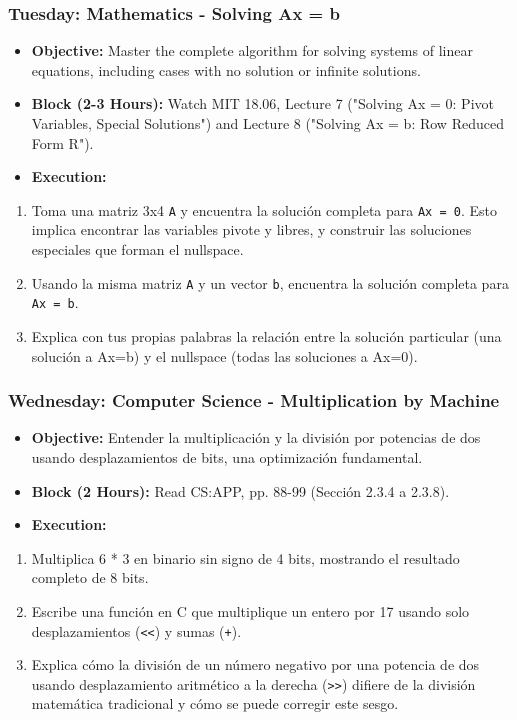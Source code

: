 \subsubsection{\textbf{Tuesday: Mathematics - Solving Ax = b}}
\begin{itemize}
  \item \textbf{Objective:} Master the complete algorithm for solving systems of linear equations, including cases with no solution or infinite solutions.
  \item \textbf{Block (2-3 Hours):} Watch MIT 18.06, Lecture 7 ("Solving Ax = 0: Pivot Variables, Special Solutions") and Lecture 8 ("Solving Ax = b: Row Reduced Form R").
  \item \textbf{Execution:}
\end{itemize}
\begin{enumerate}
  \item Toma una matriz 3x4 \texttt{A} y encuentra la solución completa para \texttt{Ax = 0}. Esto implica encontrar las variables pivote y libres, y construir las soluciones especiales que forman el nullspace.
  \item Usando la misma matriz \texttt{A} y un vector \texttt{b}, encuentra la solución completa para \texttt{Ax = b}.
  \item Explica con tus propias palabras la relación entre la solución particular (una solución a Ax=b) y el nullspace (todas las soluciones a Ax=0).

\end{enumerate}
\subsubsection{\textbf{Wednesday: Computer Science - Multiplication by Machine}}
\begin{itemize}
  \item \textbf{Objective:} Entender la multiplicación y la división por potencias de dos usando desplazamientos de bits, una optimización fundamental.
  \item \textbf{Block (2 Hours):} Read CS:APP, pp. 88-99 (Sección 2.3.4 a 2.3.8).
  \item \textbf{Execution:}
\end{itemize}
\begin{enumerate}
  \item Multiplica 6 * 3 en binario sin signo de 4 bits, mostrando el resultado completo de 8 bits.
  \item Escribe una función en C que multiplique un entero por 17 usando solo desplazamientos (\texttt{\textless{}\textless{}}) y sumas (\texttt{+}).
  \item Explica cómo la división de un número negativo por una potencia de dos usando desplazamiento aritmético a la derecha (\texttt{\textgreater{}\textgreater{}}) difiere de la división matemática tradicional y cómo se puede corregir este sesgo.

\end{enumerate}
